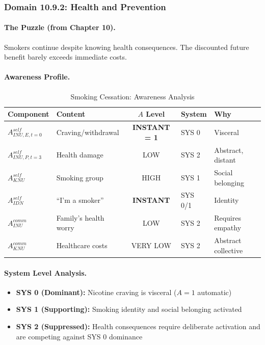 \subsubsection{Domain 10.9.2: Health and Prevention}
\label{subsubsec:awareness-health}

\paragraph{The Puzzle (from Chapter 10).}
Smokers continue despite knowing health consequences. The discounted future 
benefit barely exceeds immediate costs.

\paragraph{Awareness Profile.}

\begin{table}[htbp]
\centering
\caption{Smoking Cessation: Awareness Analysis}
\label{tab:smoking-awareness}
\renewcommand{\arraystretch}{1.3}
\begin{tabular}{@{}llcll@{}}
\toprule
\textbf{Component} & \textbf{Content} & \textbf{$A$ Level} & \textbf{System} & \textbf{Why} \\
\midrule
$A^{self}_{INU,E,t=0}$ & Craving/withdrawal & \textbf{INSTANT = 1} & SYS 0 & Visceral \\
$A^{self}_{INU,P,t=3}$ & Health damage & LOW & SYS 2 & Abstract, distant \\
$A^{self}_{KNU}$ & Smoking group & HIGH & SYS 1 & Social belonging \\
$A^{self}_{IDN}$ & ``I'm a smoker'' & \textbf{INSTANT} & SYS 0/1 & Identity \\
$A^{comm}_{INU}$ & Family's health worry & LOW & SYS 2 & Requires empathy \\
$A^{comm}_{KNU}$ & Healthcare costs & VERY LOW & SYS 2 & Abstract collective \\
\bottomrule
\end{tabular}
\end{table}

\paragraph{System Level Analysis.}
\begin{itemize}
\item \textbf{SYS 0 (Dominant):} Nicotine craving is visceral ($A = 1$ automatic)
\item \textbf{SYS 1 (Supporting):} Smoking identity and social belonging activated
\item \textbf{SYS 2 (Suppressed):} Health consequences require deliberate activation
and are competing against SYS 0 dominance
\end{itemize}

